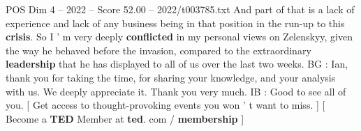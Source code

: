 \begin{textsample}{POS Dim 4 – 2022 – Score 52.00 – 2022/t003785.txt}
And part of that is a lack of experience and lack of any business being in that position in the run-up to this \textbf{crisis}.
So I ' m very deeply \textbf{conflicted} in my personal views on Zelenskyy, given the way he behaved before the invasion, compared to the extraordinary \textbf{leadership} that he has displayed to all of us over the last two weeks.
BG : Ian, thank you for taking the time, for sharing your knowledge, and your analysis with us.
We deeply appreciate it.
Thank you very much.
IB : Good to see all of you. [ Get access to thought-provoking events you won ' t want to miss. ] [ Become a \textbf{TED} Member at \textbf{ted}. com / \textbf{membership} ]

\end{textsample}

